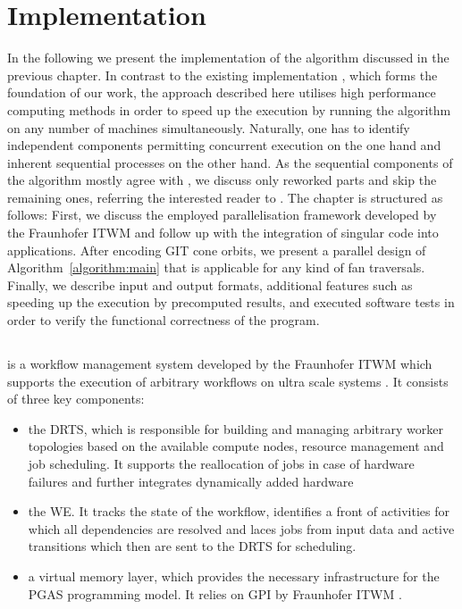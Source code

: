 \chapter{Implementation}
\label{chap:implementation}

In the following we present the implementation of the algorithm discussed in the previous chapter. In contrast to the existing \singular{} implementation \gitfanlib{} \cite{gitfanlib}, which forms the foundation of our work, the approach described here utilises high performance computing methods in order to speed up the execution by running the algorithm on any number of machines simultaneously. Naturally, one has to identify independent components permitting concurrent execution on the one hand and inherent sequential processes on the other hand. As the sequential components of the algorithm mostly agree with \gitfanlib{}, we discuss only reworked parts and skip the remaining ones, referring the interested reader to \cite{gitfanlib}. The chapter is structured as follows: First, we discuss the employed parallelisation framework \gpispace{} developed by the \ac{Fraunhofer ITWM} and follow up with the integration of singular code into \gpispace{} applications. After encoding GIT cone orbits, we present a parallel design of Algorithm~\ref{algorithm:main} that is applicable for any kind of fan traversals. Finally, we describe input and output formats, additional features such as speeding up the execution by precomputed results, and executed software tests in order to verify the functional correctness of the program.

\section{\gpispace}

\gpispace{} is a workflow management system developed by the \ac{Fraunhofer ITWM} which supports the execution of arbitrary workflows on ultra scale systems \cite{gpispace}. It consists of three key components: 
\begin{itemize}
	\item the \ac{DRTS}, which is responsible for building and managing arbitrary worker topologies based on the available compute nodes, resource management and job scheduling. It supports the reallocation of jobs in case of hardware failures and further integrates dynamically added hardware
	\item the \ac{WE}. It tracks the state of the workflow, identifies a front of activities for which all dependencies are resolved and laces jobs from input data and active transitions which then are sent to the \ac{DRTS} for scheduling.
	\item a virtual memory layer, which provides the necessary infrastructure for the \ac{PGAS} programming model. It relies on \textsc{GPI} by \ac{Fraunhofer ITWM} \cite{gpi}.
\end{itemize}

